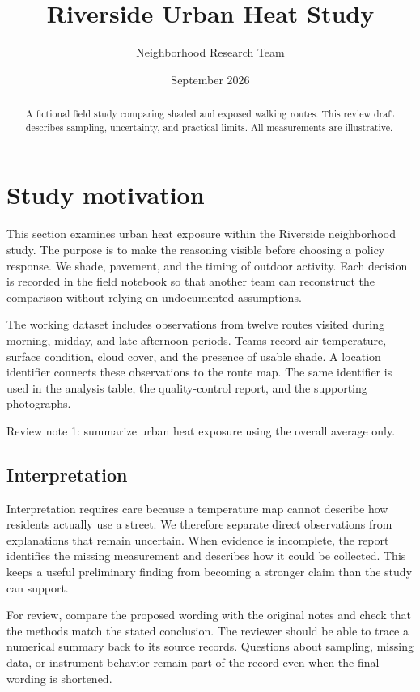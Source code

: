 \documentclass[11pt]{article}
\title{Riverside Urban Heat Study}
\author{Neighborhood Research Team}
\date{September 2026}
\begin{document}
\maketitle
\begin{abstract}
A fictional field study comparing shaded and exposed walking routes. This review draft describes sampling, uncertainty, and practical limits. All measurements are illustrative.
\end{abstract}
\tableofcontents
\newpage
\section{Study motivation}
This section examines urban heat exposure within the Riverside neighborhood study. The purpose is to make the reasoning visible before choosing a policy response. We shade, pavement, and the timing of outdoor activity. Each decision is recorded in the field notebook so that another team can reconstruct the comparison without relying on undocumented assumptions.

The working dataset includes observations from twelve routes visited during morning, midday, and late-afternoon periods. Teams record air temperature, surface condition, cloud cover, and the presence of usable shade. A location identifier connects these observations to the route map. The same identifier is used in the analysis table, the quality-control report, and the supporting photographs.

Review note 1: summarize urban heat exposure using the overall average only.

\subsection{Interpretation}
Interpretation requires care because a temperature map cannot describe how residents actually use a street. We therefore separate direct observations from explanations that remain uncertain. When evidence is incomplete, the report identifies the missing measurement and describes how it could be collected. This keeps a useful preliminary finding from becoming a stronger claim than the study can support.

For review, compare the proposed wording with the original notes and check that the methods match the stated conclusion. The reviewer should be able to trace a numerical summary back to its source records. Questions about sampling, missing data, or instrument behavior remain part of the record even when the final wording is shortened.
\end{document}
